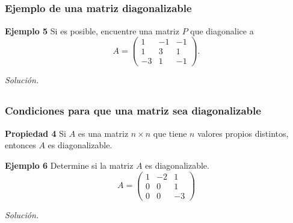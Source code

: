 
\subsection{}

\begin{frame}\frametitle{Ejemplo de una matriz diagonalizable}
	
	\begin{ej}{\textbf{Ejemplo 5}}
		Si es posible, encuentre una matriz $P$ que diagonalice a 
		\[
		A =
		\left(
		\begin{array}{rrr}
		 1 & -1 & -1 \\[1mm]
		 1 &  3 &  1 \\[1mm]
		-3 & 1 & -1
		\end{array}
		\right).
		\]	
	\end{ej}
	\textit{Solución.}
	
\end{frame}


\subsection{}

\begin{frame}\frametitle{Condiciones para que una matriz sea diagonalizable}
		
		
	\begin{prop}{\textbf{Propiedad 4}}
		\justifying
		Si $A$ es una matriz $n\times n$ que tiene $n$ valores propios distintos, entonces $A$ es diagonalizable.
	\end{prop}		
	
	\vspace{0cm}
	
	\begin{ej}{\textbf{Ejemplo 6}}
		Determine si la matriz $A$ es diagonalizable.
		\[
		A =
		\left(
		\begin{array}{rrr}
		1 & -2 &  1 \\[1mm]
		0 &  0 &  1 \\[1mm]
		0 &  0 & -3
		\end{array}
		\right)
		\]	
	\end{ej}
	\textit{Solución.}
	
\end{frame}

